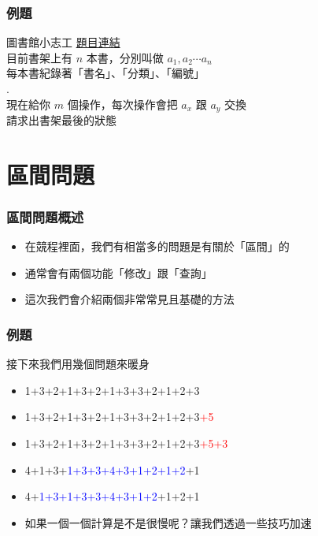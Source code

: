 \documentclass[mathserif]{beamer}
\begin{document}
\begin{frame}
    \frametitle{例題}
    \begin{block}{圖書館小志工}
        \href{}{題目連結}\\
        目前書架上有 $n$ 本書，分別叫做 $a_1, a_2 \cdots a_n$\\
        每本書紀錄著「書名」、「分類」、「編號」\\
        .\\
        現在給你 $m$ 個操作，每次操作會把 $a_x$ 跟 $a_y$ 交換\\
        請求出書架最後的狀態
    \end{block}
\end{frame}

\section{區間問題}

\begin{frame}
    \frametitle{區間問題概述}
    \begin{itemize}
        \item 在競程裡面，我們有相當多的問題是有關於「區間」的
        \item 通常會有兩個功能「修改」跟「查詢」
        \item 這次我們會介紹兩個非常常見且基礎的方法
    \end{itemize}
\end{frame}

\begin{frame}
    \frametitle{例題}
    接下來我們用幾個問題來暖身

    \begin{itemize}
        \item<1-> 1+3+2+1+3+2+1+3+3+2+1+2+3
        \item<2-> 1+3+2+1+3+2+1+3+3+2+1+2+3\textcolor{red}{+5}
        \item<3-> 1+3+2+1+3+2+1+3+3+2+1+2+3\textcolor{red}{+5+3}
        \vspace{0.5cm}
        \item<4-> 4+1+3+\textcolor{blue}{1+3+3+4+3+1+2+1+2}+1
        \item<5-> 4+\textcolor{blue}{1+3+1+3+3+4+3+1+2}+1+2+1
        \vspace{0.5cm}
        \item<6-> 如果一個一個計算是不是很慢呢？讓我們透過一些技巧加速
    \end{itemize}
\end{frame}
\end{document}
